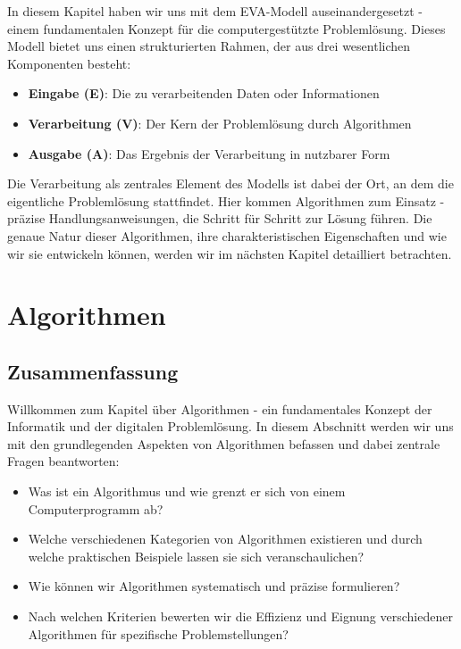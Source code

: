 \documentclass[
  letterpaper,
  DIV=11]{scrreprt}
\begin{document}
In diesem Kapitel haben wir uns mit dem EVA-Modell auseinandergesetzt -
einem fundamentalen Konzept für die computergestützte Problemlösung.
Dieses Modell bietet uns einen strukturierten Rahmen, der aus drei
wesentlichen Komponenten besteht:

\begin{itemize}
\item
  \textbf{Eingabe (E)}: Die zu verarbeitenden Daten oder Informationen
\item
  \textbf{Verarbeitung (V)}: Der Kern der Problemlösung durch
  Algorithmen
\item
  \textbf{Ausgabe (A)}: Das Ergebnis der Verarbeitung in nutzbarer Form
\end{itemize}

Die Verarbeitung als zentrales Element des Modells ist dabei der Ort, an
dem die eigentliche Problemlösung stattfindet. Hier kommen Algorithmen
zum Einsatz - präzise Handlungsanweisungen, die Schritt für Schritt zur
Lösung führen. Die genaue Natur dieser Algorithmen, ihre
charakteristischen Eigenschaften und wie wir sie entwickeln können,
werden wir im nächsten Kapitel detailliert betrachten.

\chapter{Algorithmen}\label{sec-algorithms}

\section{Zusammenfassung}\label{zusammenfassung}

Willkommen zum Kapitel über Algorithmen - ein fundamentales Konzept der
Informatik und der digitalen Problemlösung. In diesem Abschnitt werden
wir uns mit den grundlegenden Aspekten von Algorithmen befassen und
dabei zentrale Fragen beantworten:

\begin{itemize}
\item
  Was ist ein Algorithmus und wie grenzt er sich von einem
  Computerprogramm ab?
\item
  Welche verschiedenen Kategorien von Algorithmen existieren und durch
  welche praktischen Beispiele lassen sie sich veranschaulichen?
\item
  Wie können wir Algorithmen systematisch und präzise formulieren?
\item
  Nach welchen Kriterien bewerten wir die Effizienz und Eignung
  verschiedener Algorithmen für spezifische Problemstellungen?
\end{itemize}
\end{document}

